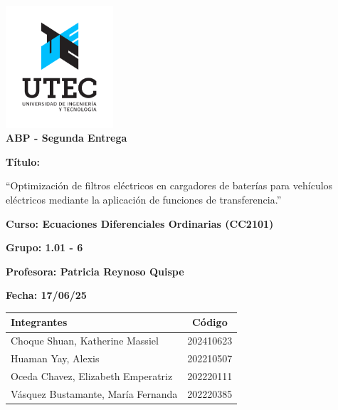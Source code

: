 \begin{titlepage}
    \centering
    \includegraphics[width=0.3\textwidth]{utec.jpg}\\
    \vspace*{2cm}
    {\LARGE\bfseries ABP - Segunda Entrega}

    \vspace{1cm}
    {\Large\bfseries Título:}

    \vspace{0.5cm}
    {\Large ``Optimización de filtros eléctricos en cargadores de baterías para vehículos eléctricos mediante la aplicación de funciones de transferencia.''}

    \vspace{1.5cm}
    {\Large\bfseries Curso: Ecuaciones Diferenciales Ordinarias (CC2101)}

    \vspace{1cm}
    {\Large\bfseries Grupo: 1.01 - 6}

    \vspace{0.5cm}
    {\Large\bfseries Profesora: Patricia Reynoso Quispe}

    \vspace{1.5cm}
    {\Large\bfseries Fecha: 17/06/25}

    \vspace{1.5cm}
    \begin{tabular}{|l|c|}
        \hline
        \textbf{Integrantes}               & \textbf{Código} \\
        \hline
        Choque Shuan, Katherine Massiel    & 202410623       \\
        \hline
        Huaman Yay, Alexis                 & 202210507       \\
        \hline
        Oceda Chavez, Elizabeth Emperatriz & 202220111       \\
        \hline
        Vásquez Bustamante, María Fernanda & 202220385       \\
        \hline
    \end{tabular}

    \vfill
\end{titlepage}